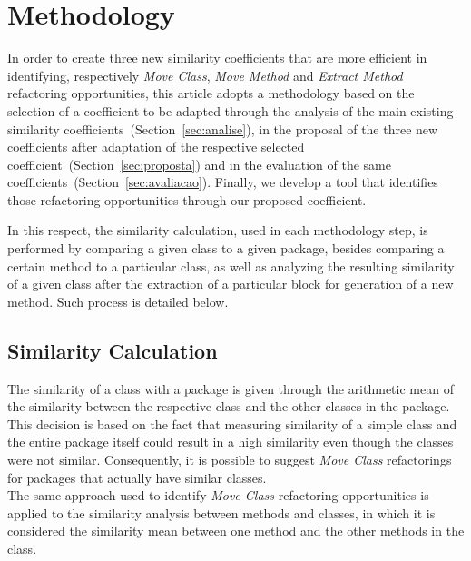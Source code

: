 \documentclass[smallextended,natbib]{svjour3}
\begin{document}
{\section{Methodology}
\label{sec:metodologia}

In order to create three new similarity coefficients that are more efficient in identifying, respectively \textit{Move Class}, \textit{Move Method} and \textit{Extract Method} refactoring opportunities, this article adopts a methodology based on the selection of a coefficient to be adapted through the analysis of the main existing similarity coefficients~(Section~\ref{sec:analise}), in the proposal of the three new coefficients after adaptation of the respective selected coefficient~(Section~\ref{sec:proposta}) and in the evaluation of the same coefficients~(Section~\ref{sec:avaliacao}). Finally, we develop a tool that identifies those refactoring opportunities through our proposed coefficient.%

In this respect, the similarity calculation, used in each methodology step, is performed by comparing a given class to a given package, besides comparing a certain method to a particular class, as well as analyzing the resulting similarity of a given class after the extraction of a particular block for generation of a new method. Such process is detailed below.

\subsection{Similarity Calculation}
\label{sec:calcsim}

 The similarity of a class with a package is given through the arithmetic mean of the similarity between the respective class and the other classes in the package. This decision is based on the fact that measuring similarity of a simple class and the entire package itself %
could result in a high similarity even though the classes were not similar. Consequently, it is possible to suggest \textit{Move Class} refactorings for packages that actually have similar classes.\\[-0.2cm]

 The same approach used to identify \textit{Move Class} refactoring opportunities is applied to the similarity analysis between methods and classes, in which it is considered the similarity mean between one method and the other methods in the class.\\[-0.2cm]

}
\end{document}
